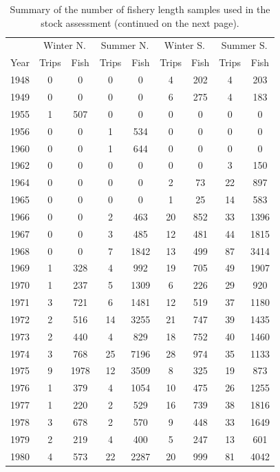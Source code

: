 \documentclass[12pt,]{article}
\begin{document}
\begin{longtable}{ccccccccc}
\caption{Summary of the number of fishery length samples used in the stock assessment (continued on the next page).} \\ 
  \hline
   & \multicolumn{2}{c}{Winter N.} &  \multicolumn{2}{c}{Summer N.} & \multicolumn{2}{c}{Winter S.} & \multicolumn{2}{c}{Summer S.} \\
 Year & Trips & Fish & Trips & Fish & Trips & Fish & Trips & Fish \\
 \hline
1948 & 0 & 0 & 0 & 0 & 4 & 202 & 4 & 203 \\ 
  1949 & 0 & 0 & 0 & 0 & 6 & 275 & 4 & 183 \\ 
  1955 & 1 & 507 & 0 & 0 & 0 & 0 & 0 & 0 \\ 
  1956 & 0 & 0 & 1 & 534 & 0 & 0 & 0 & 0 \\ 
  1960 & 0 & 0 & 1 & 644 & 0 & 0 & 0 & 0 \\ 
  1962 & 0 & 0 & 0 & 0 & 0 & 0 & 3 & 150 \\ 
  1964 & 0 & 0 & 0 & 0 & 2 & 73 & 22 & 897 \\ 
  1965 & 0 & 0 & 0 & 0 & 1 & 25 & 14 & 583 \\ 
  1966 & 0 & 0 & 2 & 463 & 20 & 852 & 33 & 1396 \\ 
  1967 & 0 & 0 & 3 & 485 & 12 & 481 & 44 & 1815 \\ 
  1968 & 0 & 0 & 7 & 1842 & 13 & 499 & 87 & 3414 \\ 
  1969 & 1 & 328 & 4 & 992 & 19 & 705 & 49 & 1907 \\ 
  1970 & 1 & 237 & 5 & 1309 & 6 & 226 & 29 & 920 \\ 
  1971 & 3 & 721 & 6 & 1481 & 12 & 519 & 37 & 1180 \\ 
  1972 & 2 & 516 & 14 & 3255 & 21 & 747 & 39 & 1435 \\ 
  1973 & 2 & 440 & 4 & 829 & 18 & 752 & 40 & 1460 \\ 
  1974 & 3 & 768 & 25 & 7196 & 28 & 974 & 35 & 1133 \\ 
  1975 & 9 & 1978 & 12 & 3509 & 8 & 325 & 19 & 873 \\ 
  1976 & 1 & 379 & 4 & 1054 & 10 & 475 & 26 & 1255 \\ 
  1977 & 1 & 220 & 2 & 529 & 16 & 739 & 38 & 1816 \\ 
  1978 & 3 & 678 & 2 & 570 & 9 & 448 & 33 & 1649 \\ 
  1979 & 2 & 219 & 4 & 400 & 5 & 247 & 13 & 601 \\ 
  1980 & 4 & 573 & 22 & 2287 & 20 & 999 & 81 & 4042 \\ 

\end{longtable}
\end{document}
